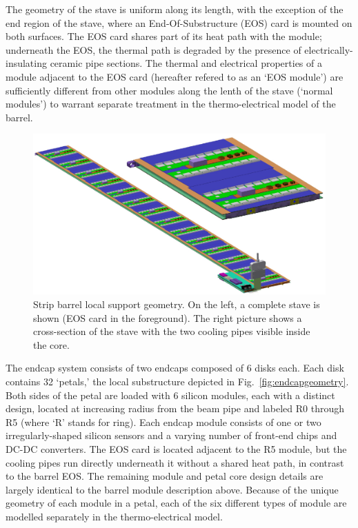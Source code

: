The geometry of the stave is uniform along its length, with the exception of the end region of the stave, where an End-Of-Substructure (EOS) card is mounted on both surfaces. The EOS card shares part of its heat path with the module; underneath the EOS, the thermal path is degraded by the presence of electrically-insulating ceramic pipe sections. The thermal and electrical properties of a module adjacent to the EOS card (hereafter refered to as an `EOS module') are sufficiently different from other modules along the lenth of the stave (`normal modules') to warrant separate treatment in the thermo-electrical model of the barrel.

\begin{figure}[ht]
\centering
\includegraphics[width=0.8\linewidth]{figures/stave.pdf}
\caption{Strip barrel local support geometry. On the left, a complete stave is shown (EOS card in the foreground). The right picture shows a cross-section of the stave with the two cooling pipes visible inside the core. }
\label{fig:barrelgeometry}
\end{figure}

The endcap system consists of two endcaps composed of 6 disks each.
Each disk contains 32 `petals,' the local substructure depicted in Fig.~\ref{fig:endcapgeometry}.
Both sides of the petal are loaded with 6 silicon modules, each with a distinct design,
located at increasing radius from the beam pipe and labeled R0 through R5 (where `R' stands for ring).
Each endcap module consists of one
or two irregularly-shaped silicon sensors and a varying number of front-end chips and DC-DC converters.
The EOS card is located adjacent to the R5 module, but the
cooling pipes run directly underneath it without a shared heat path, in contrast to the barrel EOS.
The remaining module and petal core design details are largely identical to the barrel module description above.
Because of the unique geometry of each module in a petal, each of the six different types of module are
modelled separately in the thermo-electrical model.

